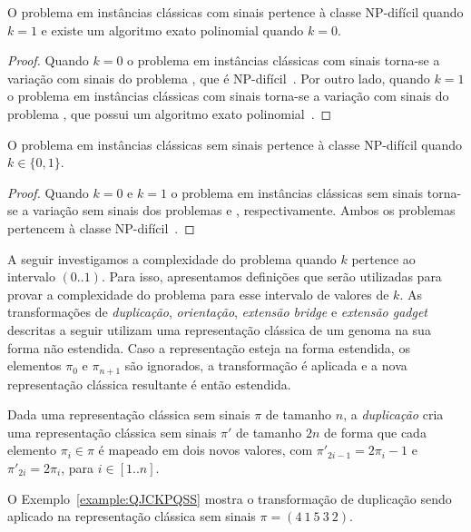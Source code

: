 \begin{lemma}
O problema \SbPRT{} em instâncias clássicas com sinais pertence à classe NP-difícil quando $k=1$ e existe um algoritmo exato polinomial quando $k=0$.
\end{lemma}
\begin{proof}
Quando $k=0$ o problema \SbPRT{} em instâncias clássicas com sinais torna-se a variação com sinais do problema \SbRT{}, que é NP-difícil~\cite{2019b-oliveira-etal}. Por outro lado, quando $k=1$ o problema \SbPRT{} em instâncias clássicas com sinais torna-se a variação com sinais do problema \SbR{}, que possui um algoritmo exato polinomial~\cite{1999-hannenhalli-pevzner}.
\end{proof}

\begin{lemma}
O problema \SbPRT{} em instâncias clássicas sem sinais pertence à classe NP-difícil quando $k \in \{0,1\}$.
\end{lemma}
\begin{proof}
Quando $k=0$ e $k=1$ o problema \SbPRT{} em instâncias clássicas sem sinais torna-se a variação sem sinais dos problemas \SbRT{} e \SbR{}, respectivamente. Ambos os problemas pertencem à classe NP-difícil~\cite{2019b-oliveira-etal,1999-caprara}.
\end{proof}

A seguir investigamos a complexidade do problema \SbPRT{} quando $k$ pertence ao intervalo $(0..1)$. Para isso, apresentamos definições que serão utilizadas para provar a complexidade do problema para esse intervalo de valores de $k$. As transformações de \emph{duplicação}, \emph{orientação}, \emph{extensão bridge} e \emph{extensão gadget} descritas a seguir utilizam uma representação clássica de um genoma na sua forma não estendida. Caso a representação esteja na forma estendida, os elementos $\pi_0$ e $\pi_{n+1}$ são ignorados, a transformação é aplicada e a nova representação clássica resultante é então estendida.

\begin{definition}
Dada uma representação clássica sem sinais $\pi$ de tamanho $n$, a \emph{duplicação} cria uma representação clássica sem sinais $\pi'$ de tamanho $2n$ de forma que cada elemento $\pi_i \in \pi$ é mapeado em dois novos valores, com $\pi'_{2i-1} = 2\pi_i-1$ e $\pi'_{2i} = 2\pi_i$, para $i \in [1..n]$.
\end{definition}

O Exemplo~\ref{example:QJCKPQSS} mostra o transformação de duplicação sendo aplicado na representação clássica sem sinais $\pi=(4~1~5~3~2)$.

